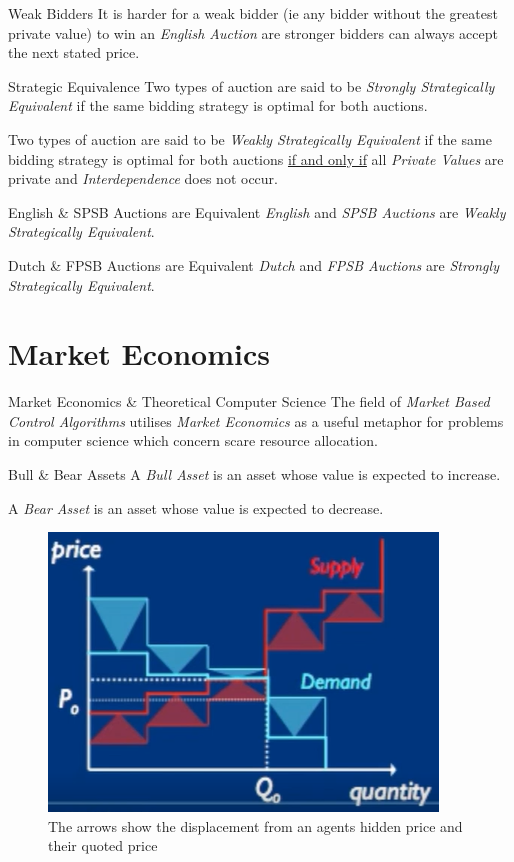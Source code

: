 \documentclass[11pt,a4paper]{article}
\begin{document}
  \begin{remark}{Weak Bidders}
    It is harder for a weak bidder (ie any bidder without the greatest private value) to win an \textit{English Auction} are stronger bidders can always accept the next stated price.
  \end{remark}

  \begin{definition}{Strategic Equivalence}
    Two types of auction are said to be \textit{Strongly Strategically Equivalent} if the same bidding strategy is optimal for both auctions.
    \par Two types of auction are said to be \textit{Weakly Strategically Equivalent} if the same bidding strategy is optimal for both auctions \underline{if and only if} all \textit{Private Values} are private and \textit{Interdependence} does not occur.
  \end{definition}

  \begin{proposition}{English \& SPSB Auctions are Equivalent}
    \textit{English} and \textit{SPSB Auctions} are \textit{Weakly Strategically Equivalent}.
  \end{proposition}

  \begin{proposition}{Dutch \& FPSB Auctions are Equivalent}
    \textit{Dutch} and \textit{FPSB Auctions} are \textit{Strongly Strategically Equivalent}.
  \end{proposition}

\section{Market Economics} \label{sec_MarketEconomics}

  \begin{remark}{Market Economics \& Theoretical Computer Science}
    The field of \textit{Market Based Control Algorithms} utilises \textit{Market Economics} as a useful metaphor for problems in computer science which concern scare resource allocation.
  \end{remark}

  \begin{definition}{Bull \& Bear Assets}
    A \textit{Bull Asset} is an asset whose value is expected to increase.
    \par A \textit{Bear Asset} is an asset whose value is expected to decrease.
  \end{definition}

  \begin{figure}[ht!]
    \centering
    \includegraphics[width=.3\textwidth]{quotedPrices.PNG}
    \caption{The arrows show the displacement from an agents hidden price and their quoted price}
    \label{fig_QuotePriceCurve}
  \end{figure}
\end{document}
